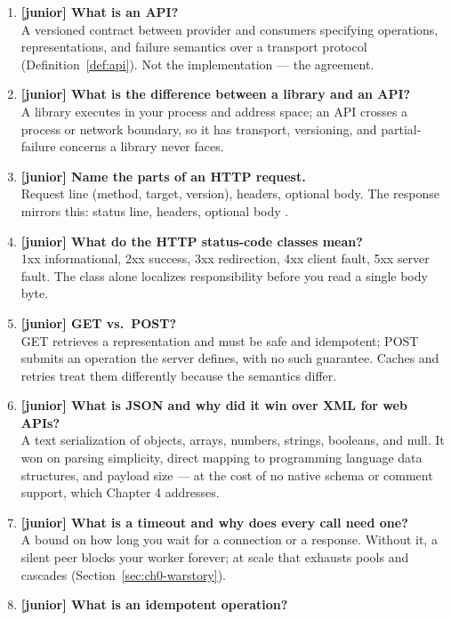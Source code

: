 \begin{enumerate}[label=\textbf{Q\arabic*.}, leftmargin=3.2em]
  \item \textbf{[junior] What is an API?}\\
    A versioned contract between provider and consumers specifying
    operations, representations, and failure semantics over a transport
    protocol (Definition~\ref{def:api}). Not the implementation --- the
    agreement.
  \item \textbf{[junior] What is the difference between a library and an
    API?}\\
    A library executes in your process and address space; an API crosses a
    process or network boundary, so it has transport, versioning, and
    partial-failure concerns a library never faces.
  \item \textbf{[junior] Name the parts of an HTTP request.}\\
    Request line (method, target, version), headers, optional body. The
    response mirrors this: status line, headers, optional body
    \cite{rfc9110}.
  \item \textbf{[junior] What do the HTTP status-code classes mean?}\\
    1xx informational, 2xx success, 3xx redirection, 4xx client fault,
    5xx server fault. The class alone localizes responsibility before you
    read a single body byte.
  \item \textbf{[junior] GET vs.\ POST?}\\
    GET retrieves a representation and must be safe and idempotent; POST
    submits an operation the server defines, with no such guarantee.
    Caches and retries treat them differently because the semantics
    differ.
  \item \textbf{[junior] What is JSON and why did it win over XML for web
    APIs?}\\
    A text serialization of objects, arrays, numbers, strings, booleans,
    and null. It won on parsing simplicity, direct mapping to programming
    language data structures, and payload size --- at the cost of no
    native schema or comment support, which Chapter 4 addresses.
  \item \textbf{[junior] What is a timeout and why does every call need
    one?}\\
    A bound on how long you wait for a connection or a response. Without
    it, a silent peer blocks your worker forever; at scale that exhausts
    pools and cascades (Section~\ref{sec:ch0-warstory}).
  \item \textbf{[junior] What is an idempotent operation?}\\

\end{enumerate}
